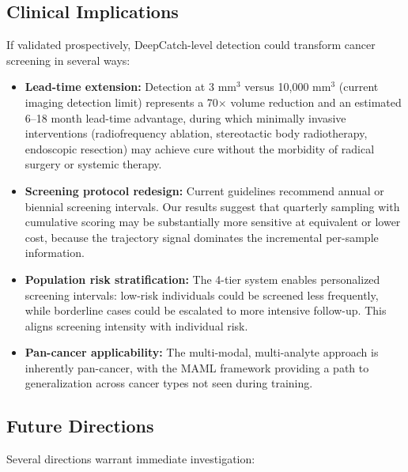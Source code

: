 \documentclass[10pt,a4paper]{article}
\begin{document}
\subsection{Clinical Implications}

If validated prospectively, DeepCatch-level detection could transform cancer screening in several ways:

\begin{itemize}
\item \textbf{Lead-time extension:} Detection at 3 mm$^3$ versus 10,000 mm$^3$ (current imaging detection limit) represents a 70$\times$ volume reduction and an estimated 6--18 month lead-time advantage, during which minimally invasive interventions (radiofrequency ablation, stereotactic body radiotherapy, endoscopic resection) may achieve cure without the morbidity of radical surgery or systemic therapy.

\item \textbf{Screening protocol redesign:} Current guidelines recommend annual or biennial screening intervals. Our results suggest that quarterly sampling with cumulative scoring may be substantially more sensitive at equivalent or lower cost, because the trajectory signal dominates the incremental per-sample information.

\item \textbf{Population risk stratification:} The 4-tier system enables personalized screening intervals: low-risk individuals could be screened less frequently, while borderline cases could be escalated to more intensive follow-up. This aligns screening intensity with individual risk.

\item \textbf{Pan-cancer applicability:} The multi-modal, multi-analyte approach is inherently pan-cancer, with the MAML framework providing a path to generalization across cancer types not seen during training.

\end{itemize}

\subsection{Future Directions}

Several directions warrant immediate investigation:
\end{document}
